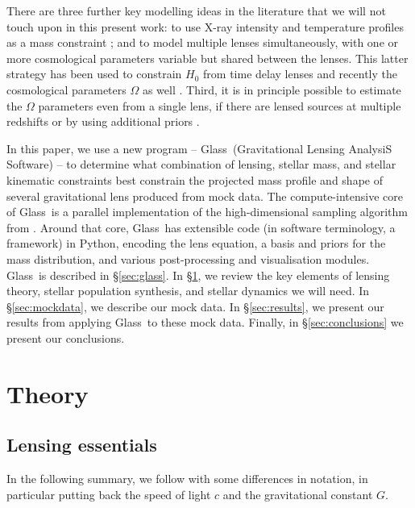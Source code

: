 \documentclass[galley,usenatbib]{mn2e}
\newcommand{\Glass}{{\sc Glass}}
\newcommand{\secref}[1] {\S\ref{#1}}
\begin{document}
There are three further key modelling ideas in the literature that we will not
touch upon in this present work: to use X-ray intensity and temperature
profiles as a mass constraint \citep[e.g.][]{2013ApJ...765...25N}; and to model
multiple lenses simultaneously, with one or more cosmological parameters
variable but shared between the lenses. This latter strategy has been used to
constrain $H_0$ from time delay lenses
\citep{2006ApJ...652L...5S,2008ApJ...679...17C,2010ApJ...712.1378P} and
recently the cosmological parameters $\Omega$ as well
\citep{2014MNRAS.437..600S}.  Third, it is in principle possible to estimate
the $\Omega$ parameters even from a single lens, if there are lensed sources at
multiple redshifts \citep{2014MNRAS.437.2461L} or by using additional priors 
\citep{2010Sci...329..924J,2013arXiv1306.4732S}.

In this paper, we use a new program -- \Glass\ (Gravitational Lensing AnalysiS
Software) -- to determine what combination of lensing, stellar mass, and
stellar kinematic constraints best constrain the projected mass profile and
shape of several gravitational lens produced from mock data.  The
compute-intensive core of \Glass\ is a parallel implementation of the
high-dimensional sampling algorithm from \cite{2012MNRAS.425.3077L}.  Around
that core, \Glass\ has extensible code (in software terminology, a framework)
in Python, encoding the lens equation, a basis and priors for the mass
distribution, and various post-processing and visualisation modules.  \Glass\
is described in \secref{sec:glass}.  In \secref{sec:theory}, we review the key
elements of lensing theory, stellar population synthesis, and stellar dynamics
we will need. In \secref{sec:mockdata}, we describe our mock data. In
\secref{sec:results}, we present our results from applying \Glass\ to these
mock data. Finally, in \secref{sec:conclusions} we present our conclusions. 

\section{Theory}\label{sec:theory}

\subsection{Lensing essentials}\label{sec:lensing_basic}

In the following summary, we follow \cite{1986ApJ...310..568B} with
some differences in notation, in particular putting back the
speed of light $c$ and the gravitational constant $G$.
\end{document}
